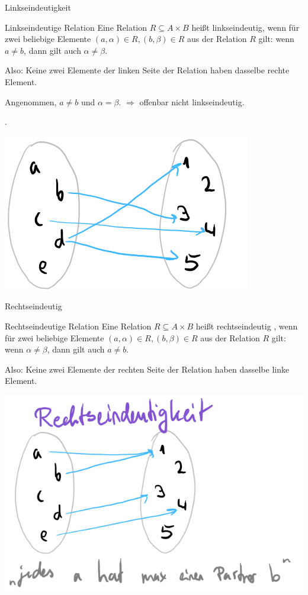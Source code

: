 \documentclass{beamer}
\begin{document}
\begin{frame}{Linkseindeutigkeit}
	\begin{block}{Linkseindeutige Relation}
		Eine Relation $R \subseteq A \times B$ heißt linkseindeutig, wenn für zwei beliebige Elemente $(a, \alpha) \in R, (b, \beta) \in R$ aus der Relation $R$ gilt: wenn $a \neq b$, dann gilt auch $\alpha \neq \beta$. 
	\end{block} 
	
	Also: Keine zwei Elemente der linken Seite der Relation haben dasselbe rechte Element. 
	
	Angenommen, $a \neq b$ und $\alpha = \beta$.   $\Rightarrow$ offenbar nicht linkseindeutig.
	
	 .
	
	\begin{center}
		\includegraphics[width=.4\linewidth]{../images/mengen_linkseindeutig.png}
	\end{center}
\end{frame}

\begin{frame}{Rechtseindeutig}
	\begin{block}{Rechtseindeutige Relation}
		Eine Relation $R \subseteq A \times B$ heißt rechtseindeutig , wenn für zwei beliebige Elemente $(a, \alpha) \in R, (b, \beta) \in R$ aus der Relation $R$ gilt: wenn $\alpha \neq \beta$, dann gilt auch $a \neq b$. 
	\end{block}
	
	Also: Keine zwei Elemente der rechten Seite der Relation haben dasselbe linke Element.
	
	\begin{center}
		\includegraphics[width=.5\linewidth]{../images/mengen_rechtseindeutig.png}
	\end{center}
\end{frame}
\end{document}

